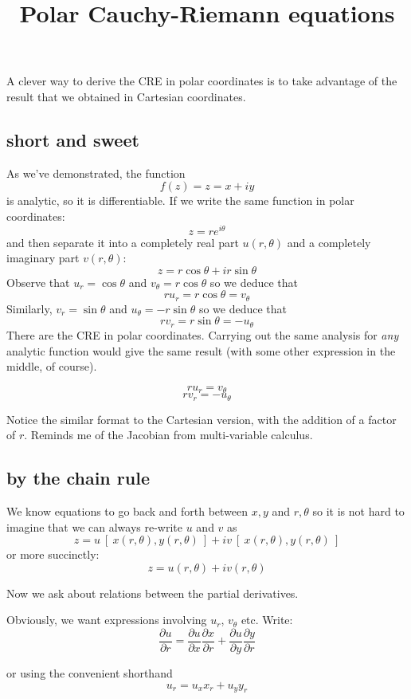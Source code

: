 \documentclass[11pt, oneside]{article}   	%
\title{Polar Cauchy-Riemann equations}
\date{}							%
\begin{document}
\maketitle
\Large
A clever way to derive the CRE in polar coordinates is to take advantage of the result that we obtained in Cartesian coordinates.

\subsection*{short and sweet}
As we've demonstrated, the function
\[ f(z) = z = x + iy \]
is analytic, so it is differentiable.  If we write the same function in polar coordinates:
\[ z = re^{i \theta} \]
and then separate it into a completely real part $u(r, \theta)$ and a completely imaginary part $v(r,\theta)$:
\[ z = r \cos \theta + i r \sin \theta \]
Observe that $u_r = \cos \theta$ and $v_{\theta} = r \cos \theta$ so we deduce that
\[ r u_r = r \cos \theta = v_{\theta} \]
Similarly, $v_r = \sin \theta$ and $u_{\theta} = - r \sin \theta$ so we deduce that
\[ r v_r = r \sin \theta = - u_{\theta} \]
There are the CRE in polar coordinates.  Carrying out the same analysis for \emph{any} analytic function would give the same result (with some other expression in the middle, of course).

\[ r u_r = v_{\theta} \]
\[ r v_r = - u_{\theta} \]

Notice the similar format to the Cartesian version, with the addition of a factor of $r$.  Reminds me of the Jacobian from multi-variable calculus.

\subsection*{by the chain rule}

We know equations to go back and forth between $x,y$ and $r, \theta$ so it is not hard to imagine that we can always re-write $u$ and $v$ as
\[ z = u \ [ \ x(r, \theta), y(r, \theta) \ ] + i v \ [ \ x(r,\theta),y(r, \theta) \ ] \]
or more succinctly:
\[ z = u(r, \theta) + i v(r, \theta) \]

Now we ask about relations between the partial derivatives.

Obviously, we want expressions involving $u_r$, $v_{\theta}$ etc.  Write:
\[ \frac{\partial u}{\partial r} = \frac{\partial u}{\partial x} \frac{\partial x}{\partial r} + \frac{\partial u}{\partial y} \frac{\partial y}{\partial r} \]

or using the convenient shorthand
\[ u_r = u_x x_r + u_y y_r \]
\end{document}
